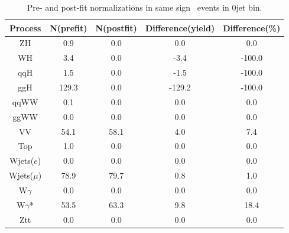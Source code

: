 \begin{table}
\begin{center}
\begin{tabular}{c|cc|cc}
\hline
\hline
Process &    N(prefit) &   N(postfit) & Difference(yield) &  Difference(\%)  \\  
\hline
\hline
ZH &        0.9 &        0.0 &        0.0 &        0.0        \\
WH &        3.4 &        0.0 &       -3.4 &     -100.0        \\
qqH &        1.5 &        0.0 &       -1.5 &     -100.0        \\
ggH &      129.3 &        0.0 &     -129.2 &     -100.0        \\
\hline
qqWW &        0.1 &        0.0 &        0.0 &        0.0        \\
ggWW &        0.0 &        0.0 &        0.0 &        0.0        \\
\hline
VV &       54.1 &       58.1 &        4.0 &        7.4        \\
\hline
Top &        1.0 &        0.0 &        0.0 &        0.0        \\
\hline
Wjets($e$) &        0.0 &        0.0 &        0.0 &        0.0        \\
Wjets($\mu$) &       78.9 &       79.7 &        0.8 &        1.0        \\
\hline
W$\gamma$ &        0.0 &        0.0 &        0.0 &        0.0        \\
W$\gamma$* &       53.5 &       63.3 &        9.8 &       18.4        \\
\hline
Ztt &        0.0 &        0.0 &        0.0 &        0.0        \\
\hline
\hline
\end{tabular}
\caption{Pre- and post-fit normalizations in same sign \M\M~events in 0jet bin. }
\label{tab:fitval_norm_ssmm_0j}
\end{center}
\end{table}


